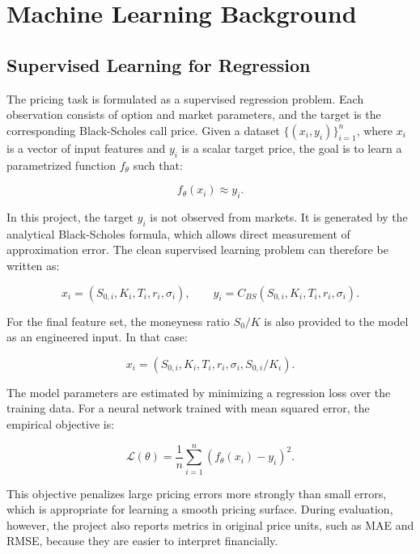 \chapter{Machine Learning Background}

\section{Supervised Learning for Regression}

The pricing task is formulated as a supervised regression problem.
Each observation consists of option and market parameters, and the target is the corresponding Black-Scholes call price.
Given a dataset $\{(x_i, y_i)\}_{i=1}^{n}$, where $x_i$ is a vector of input features and $y_i$ is a scalar target price, the goal is to learn a parametrized function $f_\theta$ such that:

\begin{equation}
    f_\theta(x_i) \approx y_i.
\end{equation}

In this project, the target $y_i$ is not observed from markets.
It is generated by the analytical Black-Scholes formula, which allows direct measurement of approximation error.
The clean supervised learning problem can therefore be written as:

\begin{equation}
    x_i = (S_{0,i}, K_i, T_i, r_i, \sigma_i),
    \qquad
    y_i = C_{BS}(S_{0,i}, K_i, T_i, r_i, \sigma_i).
\end{equation}

For the final feature set, the moneyness ratio $S_0/K$ is also provided to the model as an engineered input.
In that case:

\begin{equation}
    x_i = (S_{0,i}, K_i, T_i, r_i, \sigma_i, S_{0,i}/K_i).
\end{equation}

The model parameters are estimated by minimizing a regression loss over the training data.
For a neural network trained with mean squared error, the empirical objective is:

\begin{equation}
    \mathcal{L}(\theta)
    =
    \frac{1}{n}
    \sum_{i=1}^{n}
    \left(f_\theta(x_i) - y_i\right)^2.
\end{equation}

This objective penalizes large pricing errors more strongly than small errors, which is appropriate for learning a smooth pricing surface.
During evaluation, however, the project also reports metrics in original price units, such as MAE and RMSE, because they are easier to interpret financially.

